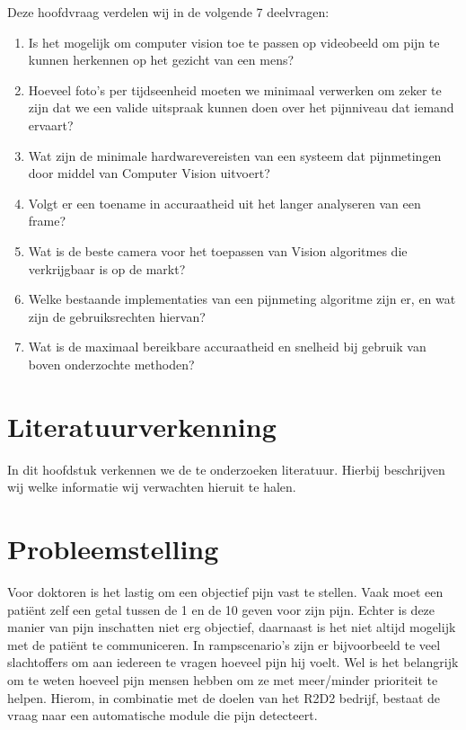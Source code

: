 \documentclass[11pt]{article}
\begin{document}
    Deze hoofdvraag verdelen wij in de volgende 7 deelvragen:

    \begin{enumerate}
        \item \label{itm:dv1} Is het mogelijk om computer vision toe te passen op videobeeld om pijn te kunnen herkennen op het gezicht van een mens?
        \item \label{itm:dv2} Hoeveel foto’s per tijdseenheid moeten we minimaal verwerken om zeker te zijn dat we een valide uitspraak kunnen doen over het pijnniveau dat iemand ervaart?
        \item \label{itm:dv3} Wat zijn de minimale hardwarevereisten van een systeem dat pijnmetingen door middel van Computer Vision uitvoert?
        \item \label{itm:dv4} Volgt er een toename in accuraatheid uit het langer analyseren van een frame?
        \item \label{itm:dv5} Wat is de beste camera voor het toepassen van Vision algoritmes die verkrijgbaar is op de markt?
        \item \label{itm:dv6} Welke bestaande implementaties van een pijnmeting algoritme zijn er, en wat zijn de gebruiksrechten hiervan?
        \item \label{itm:dv7} Wat is de maximaal bereikbare accuraatheid en snelheid bij gebruik van boven onderzochte methoden?
    \end{enumerate}


    \section{Literatuurverkenning}
    In dit hoofdstuk verkennen we de te onderzoeken literatuur. Hierbij beschrijven wij welke informatie wij verwachten hieruit te halen.


    \section{Probleemstelling}
    Voor doktoren is het lastig om een objectief pijn vast te stellen.
    Vaak moet een patiënt zelf een getal tussen de 1 en de 10 geven voor zijn pijn.
    Echter is deze manier van pijn inschatten niet erg objectief, daarnaast is het niet
    altijd mogelijk met de patiënt te communiceren.
    In rampscenario’s zijn er bijvoorbeeld te veel slachtoffers om aan iedereen te vragen hoeveel pijn hij voelt.
    Wel is het belangrijk om te weten hoeveel pijn mensen hebben om ze met meer/minder prioriteit te helpen.
    Hierom, in combinatie met de doelen van het R2D2 bedrijf, bestaat de vraag naar een automatische module die pijn
    detecteert.
\end{document}
